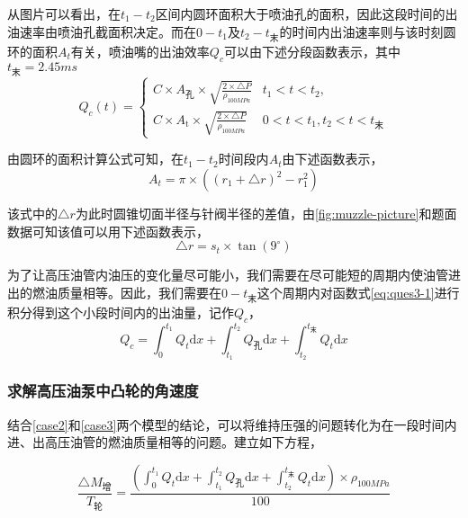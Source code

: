 \documentclass[withoutpreface,bwprint]{cumcmthesis} %
\begin{document}
从图片可以看出，在$t_{1}-t_{2}$区间内圆环面积大于喷油孔的面积，因此这段时间的出油速率由喷油孔截面积决定。而在$0-t_{1}$及$t_{2}-t_{\text{末}}$的时间内出油速率则与该时刻圆环的面积$A_{t}$有关，喷油嘴的出油效率$Q_{c}$可以由下述分段函数表示，其中$t_{\text{末}} = 2.45ms$
\begin{equation}
Q_{c}(t) =
\begin{cases}
C\times A_{\text{孔}}\times \sqrt{\frac{2\times \triangle P}{\rho_{100MPa}}} &   t_{1}<t<t_{2} ,\\
C\times A_{\text{t}}\times \sqrt{\frac{2\times \triangle P}{\rho_{100MPa}}} &   0<t<t_{1},t_{2}<t<t_{\text{末}}
\end{cases}\label{eq:ques3-1}
\end{equation}

由圆环的面积计算公式可知，在$t_{1}-t_{2}$时间段内$A_{t}$由下述函数表示，
\begin{equation*}
A_{t} = \pi\times ((r_{1}+\triangle r)^{2}-r_{1}^{2})\label{eq:ques3-2}	
\end{equation*}

该式中的$\triangle r$为此时圆锥切面半径与针阀半径的差值，由\cref{fig:muzzle-picture}和题面数据可知该值可以用下述函数表示，
\begin{equation*}
\triangle r = s_{t}\times\tan(9^{\circ})\label{eq:ques3-3}	
\end{equation*}
 
为了让高压油管内油压的变化量尽可能小，我们需要在尽可能短的周期内使油管进出的燃油质量相等。因此，我们需要在$0-t_{\text{末}}$这个周期内对函数式\cref{eq:ques3-1}进行积分得到这个小段时间内的出油量，记作$Q_{c}$，
\begin{equation}
Q_{c} = \int_{0}^{t_{1}}Q_{t}\text{d}x+\int_{t_{1}}^{t_{2}}Q_{\text{孔}}\text{d}x+\int_{t_{2}}^{t_{\text{末}}}Q_{t}\text{d}x \label{eq:ques3-4}	
\end{equation}

\subsubsection{求解高压油泵中凸轮的角速度}
结合\ref{case2}和\ref{case3}两个模型的结论，可以将维持压强的问题转化为在一段时间内进、出高压油管的燃油质量相等的问题。建立如下方程，

\begin{equation}
 \frac{\triangle M_{\text{增}}}{T_{\text{轮}}}=\frac{\left(\int_{0}^{t_{1}}Q_{t}\text{d}x+\int_{t_{1}}^{t_{2}}Q_{\text{孔}}\text{d}x+\int_{t_{2}}^{t_{\text{末}}}Q_{t}\text{d}x\right)\times \rho_{100MPa}}{100}\label{eq:ques3-10}	
\end{equation}
\end{document}
